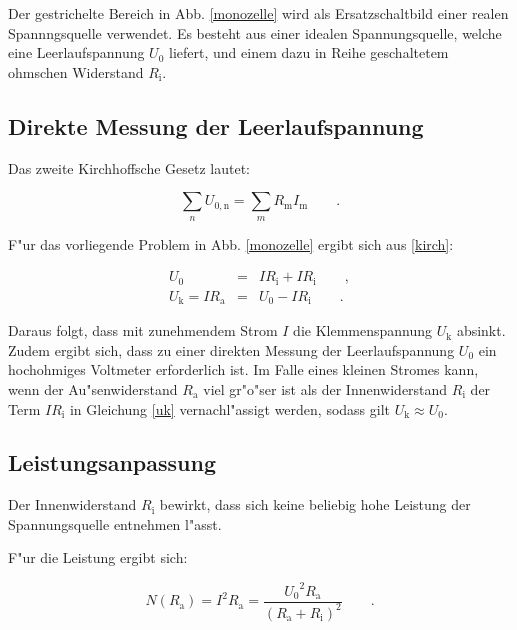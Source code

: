Der gestrichelte Bereich in Abb. \ref{monozelle} wird als Ersatzschaltbild einer realen Spannngsquelle verwendet.
Es besteht aus einer idealen Spannungsquelle, welche eine Leerlaufspannung $U_\mathrm{0}$ liefert, und einem dazu in Reihe geschaltetem ohmschen Widerstand $R_\mathrm{i}$.

\subsection{Direkte Messung der Leerlaufspannung} %
\label{sub:direkte_messung_der_leerlaufspannung}

Das zweite Kirchhoffsche Gesetz lautet:

\begin{equation}
	\sum_n U_\mathrm{0,n} = \sum_m R_\mathrm{m} I_\mathrm{m} \qquad . \label{kirch}
\end{equation}

F"ur das vorliegende Problem in Abb. \ref{monozelle} ergibt sich aus \eqref{kirch}:

\begin{eqnarray}
	U_\mathrm{0} &=& I R_\mathrm{i} + I R_\mathrm{i} \qquad , \nonumber \\
	U_\mathrm{k} = I R_\mathrm{a} &=& U_\mathrm{0} - I R_\mathrm{i} \qquad . \label{uk}
\end{eqnarray}

Daraus folgt, dass mit zunehmendem Strom $I$ die Klemmenspannung $U_\mathrm{k}$ absinkt.
Zudem ergibt sich, dass zu einer direkten Messung der Leerlaufspannung $U_\mathrm{0}$ ein hochohmiges Voltmeter erforderlich ist. Im Falle eines kleinen Stromes kann, wenn der Au"senwiderstand $R_\mathrm{a}$ viel gr"o"ser ist als der Innenwiderstand $R_\mathrm{i}$ der Term $I R_\mathrm{i}$ in Gleichung \eqref{uk} vernachl"assigt werden, sodass gilt $U_\mathrm{k} \approx U_\mathrm{0}$.

\subsection{Leistungsanpassung} %
\label{sub:leistungsanpassung}

Der Innenwiderstand $R_\mathrm{i}$ bewirkt, dass sich keine beliebig hohe Leistung der Spannungsquelle entnehmen l"asst.

F"ur die Leistung ergibt sich:

\begin{equation}
	N(R_\mathrm{a}) = I^2 R_\mathrm{a} = \frac{{U_\mathrm{0} }^2 R_\mathrm{a}}{{(R_\mathrm{a} + R_\mathrm{i})}^2} \qquad . \label{eqn:leistung}
\end{equation}

